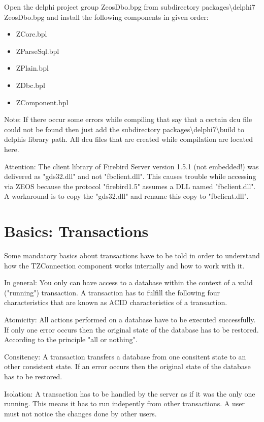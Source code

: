 \documentclass[a4paper,12pt,oneside]{book}
\begin{document}
Open the delphi project group ZeosDbo.bpg from subdirectory packages\textbackslash delphi7 ZeosDbo.bpg and install
the following components in given order:
\begin{itemize}
\item ZCore.bpl
\item ZParseSql.bpl
\item ZPlain.bpl
\item ZDbc.bpl
\item ZComponent.bpl
\end{itemize}

Note: If there occur some errors while compiling that say that a certain dcu file could not be found then just add the subdirectory packages\textbackslash delphi7\textbackslash build to delphis library path.
All dcu files that are created while compilation are located here.

Attention: The client library of Firebird Server version 1.5.1 (not embedded!) was delivered as "gds32.dll" and not "fbclient.dll".
This causes trouble while accessing via ZEOS because the protocol "firebird1.5" assumes a DLL named "fbclient.dll".
A workaround is to copy the "gds32.dll" and rename this copy to "fbclient.dll".

\section{Basics: Transactions}
Some mandatory basics about transactions have to be told in order to understand how the TZConnection
component works internally and how to work with it.

In general: You only can have access to a database within the context of a valid ("running") transaction.
A transaction has to fulfill the following four characteristics that are known as ACID characteristics of a transaction.

Atomicity: All actions performed on a database have to be executed successfully.
If only one error occurs then the original state of the database has to be restored.
According to the principle "all or nothing".

Consitency: A transaction transfers a database from one consitent state to an other consistent state.
If an error occurs then the original state of the database has to be restored.

Isolation: A transaction has to be handled by the server as if it was the only one running.
This means it has to run indepently from other transactions.
A user must not notice the changes done by other users.
\end{document}

